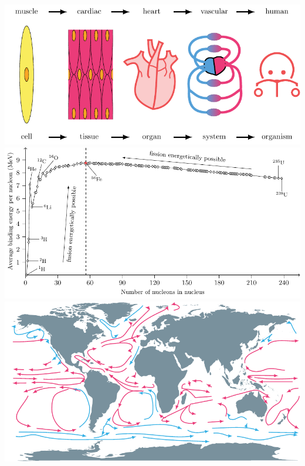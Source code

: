     \clearpage
    \begin{center}
        \includegraphics[width=0.85\linewidth]{./TikZimages/TikZ10.pdf}\\
        \vfill
        \includegraphics[width=0.85\linewidth]{./TikZimages/TikZ12.pdf}\\
        \vfill
        \includegraphics[width=0.85\linewidth]{./TikZimages/TikZ11.pdf}
    \end{center}

